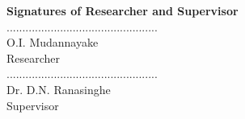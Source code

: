 \begin{center}
    {\large \textbf{Signatures of Researcher and Supervisor\\}}
    \vspace{5cm}
    ................................................\\
    O.I. Mudannayake\\
    Researcher\\
    \vspace{3cm}
    ................................................\\
    Dr. D.N. Ranasinghe\\
    Supervisor
\end{center}